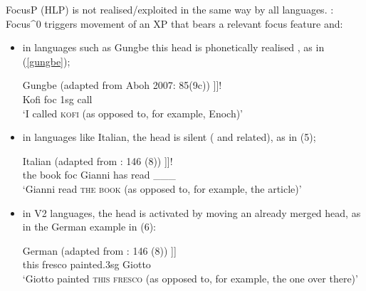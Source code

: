 \documentclass[fleqn,10pt]{wlscirep}
\begin{document}
\noindent FocusP (HLP) is not realised/exploited in the same way by all languages. \citet{samo2019cartography}: Focus^0 triggers movement of an XP that bears a relevant focus feature and:
\begin{itemize}
    \item \vspace*{-2mm} in languages such as Gungbe this head is phonetically realised \citep{aboh2004morphosyntax}, as in (\ref{gungbe});
    
        \begin{exe}
            \ex Gungbe (adapted from Aboh 2007: 85(9c))
                \gll [\textsubscript{FocusP}  	\textsc{kofi}\textsubscript{i}   [\textsubscript{Focus^0} 	wè 			[	ùn   		yró		\_\_\_\textsubscript{i}		]]]!\\
                {} Kofi        {} 			foc    {}    	1sg   	call {} {}\\
                \vspace{-3mm}
                \glt ‘I called \textsc{kofi} (as opposed to, for example, Enoch)’
        \label{gungbe}
        \end{exe}

    \item \vspace*{-2mm} in languages like Italian, the head is silent (\citealt{rizzi1997fine} and related), as in (5);
        \begin{exe}
            \ex Italian (adapted from \citealt{samo2019cartography}: 146 (8))
                \gll [\textsubscript{FocusP} 	\textsc{il} \textsc{libro}\textsubscript{i}	    [\textsubscript{Focus^0} 	$\emptyset$ 		[	Gianni 		ha 		letto 	\_\_\_\textsubscript{i}	]]]!\\
                {} the book				{}		foc		{}	Gianni 		has 	read 	\_\_\_\\
                \vspace{-3mm}
                \glt ‘Gianni read \textsc{the} \textsc{book} (as opposed to, for example, the article)’	
        \end{exe}

    \item \vspace*{-2mm} in V2 languages, the head is activated by moving an already merged head, as in the German example in (6):
        \begin{exe}
            \ex	German (adapted from \citealt{samo2019cartography}: 146 (8))
                \gll [\textsubscript{SpecFoc} 	\textsc{dieses} 	\textsc{fresko} 	[\textsubscript{Focus^0} 	malte				[	Giotto ]]]\\
                {} this 			fresco			{}		painted.3sg	{}	Giotto \\
                \vspace*{-3mm}
                \glt ‘Giotto painted \textsc{this} \textsc{fresco} (as opposed to, for example, the one over there)’
        \end{exe}

\end{itemize}
\end{document}
